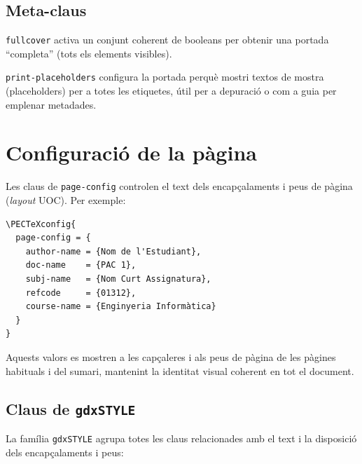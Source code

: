 \documentclass[11pt,a4paper]{article}
\begin{document}
\subsection*{Meta-claus}

\begin{description}
  \item{\verb|fullcover|} activa un conjunt coherent de booleans per
    obtenir una portada ``completa'' (tots els elements visibles).
  \item{\verb|print-placeholders|} configura la portada perquè mostri
    textos de mostra (placeholders) per a totes les etiquetes, útil
    per a depuració o com a guia per emplenar metadades.
\end{description}

\section{Configuració de la pàgina}

Les claus de \verb|page-config| controlen el text dels encapçalaments
i peus de pàgina (\emph{layout} UOC). Per exemple:
\begin{verbatim}
\PECTeXconfig{
  page-config = {
    author-name = {Nom de l'Estudiant},
    doc-name    = {PAC 1},
    subj-name   = {Nom Curt Assignatura},
    refcode     = {01312},
    course-name = {Enginyeria Informàtica}
  }
}
\end{verbatim}

Aquests valors es mostren a les capçaleres i als peus de pàgina de
les pàgines habituals i del sumari, mantenint la identitat visual
coherent en tot el document.

\subsection*{Claus de \texttt{gdxSTYLE}}

La família \verb|gdxSTYLE| agrupa totes les claus relacionades amb el
text i la disposició dels encapçalaments i peus:
\end{document}
